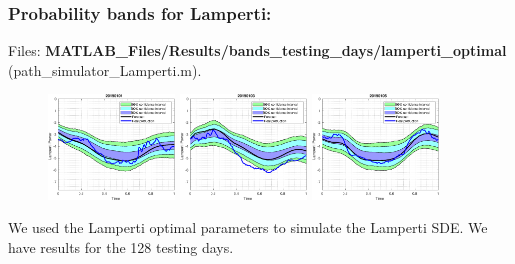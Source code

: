 \documentclass[aspectratio=169]{beamer}\usepackage[utf8]{inputenc}
\begin{document}
\begin{frame}\frametitle{Probability bands for Lamperti:}
Files: \textbf{MATLAB\_Files/Results/bands\_testing\_days/lamperti\_optimal} (path\_simulator\_Lamperti.m).

\begin{figure}[ht!]
\centering
\includegraphics[width=0.3\textwidth]{../../MATLAB_Files/Results/bands_testing_days/lamperti_optimal/1.eps}
\includegraphics[width=0.3\textwidth]{../../MATLAB_Files/Results/bands_testing_days/lamperti_optimal/2.eps}
\includegraphics[width=0.3\textwidth]{../../MATLAB_Files/Results/bands_testing_days/lamperti_optimal/3.eps}
\end{figure}

We used the Lamperti optimal parameters to simulate the Lamperti SDE. We have results for the 128 testing days.

\end{frame}

\end{document}
